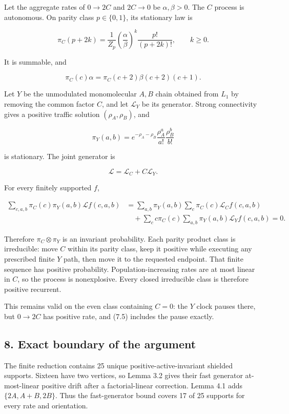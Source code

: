 Let the aggregate rates of \(0\to2C\) and \(2C\to0\) be
\(\alpha,\beta>0\). The \(C\) process is autonomous. On parity class
\(p\in\{0,1\}\), its stationary law is

\[
 \pi_C(p+2k)=\frac1{Z_p}
 \left(\frac\alpha\beta\right)^k\frac{p!}{(p+2k)!},
 \qquad k\ge0.
\tag{7.1}
\]

It is summable, and

\[
 \pi_C(c)\alpha
 =\pi_C(c+2)\beta(c+2)(c+1).
\tag{7.2}
\]

Let \(Y\) be the unmodulated monomolecular \(A,B\) chain obtained from
\(L_1\) by removing the common factor \(C\), and let \(\mathcal L_Y\) be
its generator. Strong connectivity gives a positive traffic solution
\((\rho_A,\rho_B)\), and

\[
 \pi_Y(a,b)=e^{-\rho_A-\rho_B}
 \frac{\rho_A^a}{a!}\frac{\rho_B^b}{b!}
\tag{7.3}
\]

is stationary. The joint generator is

\[
 \mathcal L=\mathcal L_C+C\mathcal L_Y.
\tag{7.4}
\]

For every finitely supported \(f\),

\[
\begin{split}
 \sum_{c,a,b}\pi_C(c)\pi_Y(a,b)\mathcal Lf(c,a,b)
 &=\sum_{a,b}\pi_Y(a,b)\sum_c\pi_C(c)\mathcal L_Cf(c,a,b)\\
 &\quad+\sum_c c\pi_C(c)
   \sum_{a,b}\pi_Y(a,b)\mathcal L_Yf(c,a,b)=0.
\end{split}
\tag{7.5}
\]

Therefore \(\pi_C\otimes\pi_Y\) is an invariant probability. Each parity
product class is irreducible: move \(C\) within its parity class, keep
it positive while executing any prescribed finite \(Y\) path, then move
it to the requested endpoint. That finite sequence has positive
probability. Population-increasing rates are at most linear in \(C\), so
the process is nonexplosive. Every closed irreducible class is therefore
positive recurrent.

This remains valid on the even class containing \(C=0\): the \(Y\) clock
pauses there, but \(0\to2C\) has positive rate, and (7.5) includes the
pause exactly.

\subsection{8. Exact boundary of the
argument}

The finite reduction contains 25 unique positive-active-invariant
shielded supports. Sixteen have two vertices, so Lemma 3.2 gives their
fast generator at-most-linear positive drift after a factorial-linear
correction. Lemma 4.1 adds \(\{2A,A+B,2B\}\). Thus the fast-generator
bound covers 17 of 25 supports for every rate and orientation.

